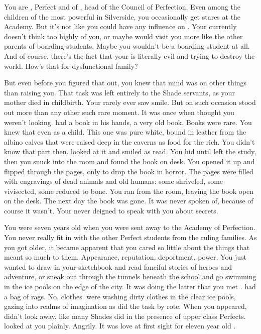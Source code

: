 \documentclass[char]{Silversiders}
\begin{document}
\name{\cTruth{}}

You are \cTruth{}, Perfect and \cTruth{\offspring} of \cDeath{\full}, head of the Council of Perfection. Even among the children of the most powerful in Silverside, you occasionally get stares at the Academy. But it's not like you could have any influence on \cDeath{\them}. Your \cDeath{\parent} currently doesn't think too highly of you, or maybe \cDeath{\they} would visit you more like the other parents of boarding students. Maybe you wouldn't be a boarding student at all. And of course, there's the fact that your \cDeath{\parent} is literally evil and trying to destroy the world. How's that for dysfunctional family? 

But even before you figured that out, you knew that \cDeath{\their} mind was on other things than raising you. That task was left entirely to the Shade servants, as your mother died in childbirth. Your rarely ever saw \cDeath{\them} smile. But on such occasion stood out more than any other such rare moment. It was once when \cDeath{\they} thought you weren't looking. \cDeath{\They} had a book in his hands, a very old book. Books were rare. You knew that even as a child. This one was pure white, bound in leather from the albino calves that were raised deep in the caverns as food for the rich. You didn't know that part then. \cDeath{\They} looked at it and smiled as \cDeath{\they} read. You hid until \cDeath{\they} left the study, then you snuck into the room and found the book on \cDeath{\their} desk. You opened it up and flipped through the pages, only to drop the book in horror. The pages were filled with engravings of dead animals and old humans: some shriveled, some vivisected, some reduced to bone. You ran from the room, leaving the book open on the desk. The next day the book was gone. It was never spoken of, because of course it wasn't. Your \cDeath{\parent} never deigned to speak with you about \cDeath{\their} secrets.

You were seven years old when you were sent away to the Academy of Perfection. You never really fit in with the other Perfect students from the ruling families. As you got older, it became apparent that you cared so little about the things that meant so much to them. Appearance, reputation, deportment, power. You just wanted to draw in your sketchbook and read fanciful stories of heroes and adventure, or sneak out through the tunnels beneath the school and go swimming in the ice pools on the edge of the city. It was doing the latter that you met \cWisdom{}. \cWisdom{\They} had a bag of rags. No, clothes. \cWisdom{\They} were washing dirty clothes in the clear ice pools, gazing into realms of imagination as \cWisdom{\they} did the task by rote. When you appeared, \cWisdom{} didn't look away, like many Shades did in the presence of upper class Perfects. \cWisdom{\They} looked at you plainly. Angrily. It was love at first sight for eleven year old \cTruth{}.
\end{document}

